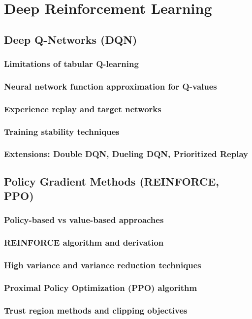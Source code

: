 ﻿\chapter{Deep Reinforcement Learning}
\section{Deep Q-Networks (DQN)}
\subsection{Limitations of tabular Q-learning}
\subsection{Neural network function approximation for Q-values}
\subsection{Experience replay and target networks}
\subsection{Training stability techniques}
\subsection{Extensions: Double DQN, Dueling DQN, Prioritized Replay}

\section{Policy Gradient Methods (REINFORCE, PPO)}
\subsection{Policy-based vs value-based approaches}
\subsection{REINFORCE algorithm and derivation}
\subsection{High variance and variance reduction techniques}
\subsection{Proximal Policy Optimization (PPO) algorithm}
\subsection{Trust region methods and clipping objectives}

